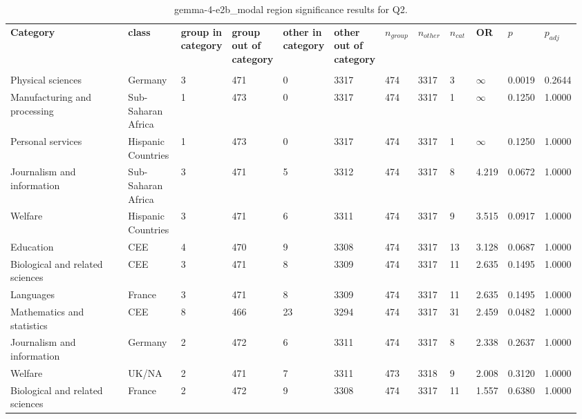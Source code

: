 \clearpage
\begin{landscape}
\begin{table}[p]
\centering
\caption{gemma-4-e2b_modal region significance results for Q2.}
\label{tab:appendix-q2-gemma-4-e2b_modal-region}
\scriptsize
\renewcommand{\arraystretch}{0.92}
\setlength{\tabcolsep}{2pt}
\begin{tabular}{p{0.35\linewidth}p{0.1\linewidth}p{0.05\linewidth}p{0.05\linewidth}p{0.05\linewidth}p{0.05\linewidth}p{0.05\linewidth}p{0.05\linewidth}p{0.05\linewidth}p{0.05\linewidth}p{0.05\linewidth}p{0.06\linewidth}}
\toprule
\textbf{Category} & \textbf{class} & \textbf{group in category} & \textbf{group out of category} & \textbf{other in category} & \textbf{other out of category} & \textbf{$n_{group}$} & \textbf{$n_{other}$} & \textbf{$n_{cat}$} & \textbf{OR} & \textbf{$p$} & \textbf{$p_{adj}$} \\\\
\midrule
Physical sciences & Germany & 3 & 471 & 0 & 3317 & 474 & 3317 & 3 & $\infty$ & 0.0019 & 0.2644 \\
Manufacturing and processing & Sub-Saharan Africa & 1 & 473 & 0 & 3317 & 474 & 3317 & 1 & $\infty$ & 0.1250 & 1.0000 \\
Personal services & Hispanic Countries & 1 & 473 & 0 & 3317 & 474 & 3317 & 1 & $\infty$ & 0.1250 & 1.0000 \\
Journalism and information & Sub-Saharan Africa & 3 & 471 & 5 & 3312 & 474 & 3317 & 8 & 4.219 & 0.0672 & 1.0000 \\
Welfare & Hispanic Countries & 3 & 471 & 6 & 3311 & 474 & 3317 & 9 & 3.515 & 0.0917 & 1.0000 \\
Education & CEE & 4 & 470 & 9 & 3308 & 474 & 3317 & 13 & 3.128 & 0.0687 & 1.0000 \\
Biological and related sciences & CEE & 3 & 471 & 8 & 3309 & 474 & 3317 & 11 & 2.635 & 0.1495 & 1.0000 \\
Languages & France & 3 & 471 & 8 & 3309 & 474 & 3317 & 11 & 2.635 & 0.1495 & 1.0000 \\
Mathematics and statistics & CEE & 8 & 466 & 23 & 3294 & 474 & 3317 & 31 & 2.459 & 0.0482 & 1.0000 \\
Journalism and information & Germany & 2 & 472 & 6 & 3311 & 474 & 3317 & 8 & 2.338 & 0.2637 & 1.0000 \\
Welfare & UK/NA & 2 & 471 & 7 & 3311 & 473 & 3318 & 9 & 2.008 & 0.3120 & 1.0000 \\
Biological and related sciences & France & 2 & 472 & 9 & 3308 & 474 & 3317 & 11 & 1.557 & 0.6380 & 1.0000 \\

\end{tabular}
\end{table}
\end{landscape}
